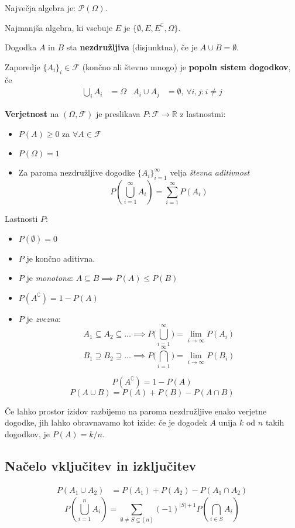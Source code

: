 \begin{multicols}{5}
Največja algebra je: $\mathcal{P}(\Omega)$.

Najmanjša algebra, ki vsebuje $E$ je $\{ \emptyset, E, E^\complement, \Omega \}$.

Dogodka $A$ in $B$ sta \textbf{nezdružljiva} (disjunktna), če je $A \cup B = \emptyset$.

Zaporedje $\{ A_i \}_i \in \mathcal{F}$ (končno ali števno mnogo) je \textbf{popoln sistem dogodkov}, če
\begin{align*}
    \bigcup_i A_i &= \Omega & A_i \cup A_j &= \emptyset, \, \forall i,j: i\neq j
\end{align*}


\textbf{Verjetnost} na $(\Omega, \mathcal{F})$ je preslikava $P: \mathcal{F} \to \mathbb{R}$ z lastnostmi:

\begin{itemize}
    \item $P(A) \geq 0$ za $\forall A \in \mathcal{F}$
    \item $P(\Omega) = 1$
    \item Za paroma nezdružljive dogodke $\{ A_i \}_{i=1}^\infty $ velja \textit{števna aditivnost}
    \[ P(\bigcup_{i=1}^\infty A_i) = \sum_{i=1}^\infty P(A_i)\]
\end{itemize}

Lastnosti $P$:
\begin{itemize}
    \item $P(\emptyset) = 0$
    \item $P$ je končno aditivna.
    \item $P$ je \textit{monotona}: $A \subseteq B \implies P(A) \leq P(B)$
    \item $P(A^\complement) = 1 - P(A)$
    \item $P$ je \textit{zvezna}:
    \[ A_1 \subseteq A_2 \subseteq \dots \implies P\big(\bigcup_{i=1}^\infty\big) = \lim_{i \to \infty} P(A_i)\]
    \[ B_1 \supseteq B_2 \supseteq \dots \implies P\big(\bigcap_{i=1}^\infty\big) = \lim_{i \to \infty} P(B_i)\]
\end{itemize}


\[P(A^\complement) = 1 - P(A)\]
\[ P(A \cup B) = P(A) + P(B) - P(A \cap B) \]

Če lahko prostor izidov razbijemo na paroma nezdružljive enako verjetne dogodke, jih lahko obravnavamo kot izide: če je dogodek $A$ unija $k$ od $n$ takih dogodkov, je $P(A) = k/n$.

\subsection{Načelo vključitev in izključitev}
\begin{align*}
    P(A_1 \cup A_2) &= P(A_1) + P(A_2) - P(A_1 \cap A_2)
\end{align*}
\[ P( \bigcup_{i=1}^n A_i) = \sum_{\emptyset \neq S \subseteq [n]} (-1)^{|S|+1} P(\bigcap_{i\in S} A_i)\]


\end{multicols}
